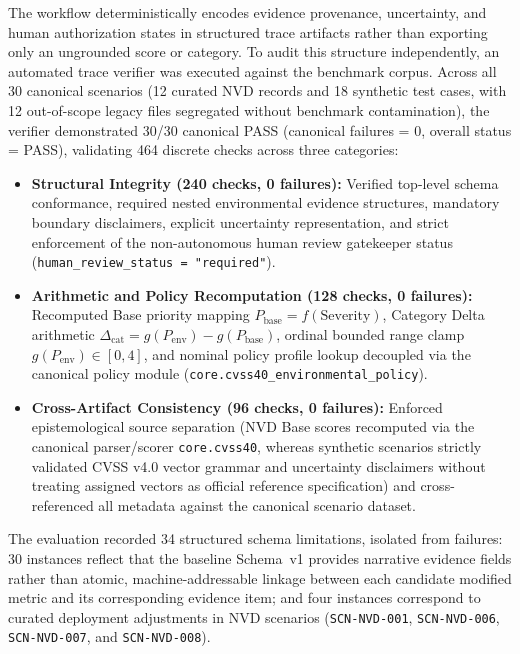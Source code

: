 \documentclass[conference]{IEEEtran}
\begin{document}
The workflow deterministically encodes evidence provenance, uncertainty, and human authorization states in structured trace artifacts rather than exporting only an ungrounded score or category. To audit this structure independently, an automated trace verifier was executed against the benchmark corpus. Across all 30 canonical scenarios (12 curated NVD records and 18 synthetic test cases, with 12 out-of-scope legacy files segregated without benchmark contamination), the verifier demonstrated 30/30 canonical PASS (canonical failures = 0, overall status = PASS), validating 464 discrete checks across three categories:
\begin{itemize}
    \item \textbf{Structural Integrity (240 checks, 0 failures):} Verified top-level schema conformance, required nested environmental evidence structures, mandatory boundary disclaimers, explicit uncertainty representation, and strict enforcement of the non-autonomous human review gatekeeper status (\texttt{human\_review\_status = "required"}).
    \item \textbf{Arithmetic and Policy Recomputation (128 checks, 0 failures):} Recomputed Base priority mapping $P_{\text{base}} = f(\text{Severity})$, Category Delta arithmetic $\Delta_{\text{cat}} = g(P_{\text{env}}) - g(P_{\text{base}})$, ordinal bounded range clamp $g(P_{\text{env}}) \in [0, 4]$, and nominal policy profile lookup decoupled via the canonical policy module (\texttt{core.cvss40\_environmental\_policy}).
    \item \textbf{Cross-Artifact Consistency (96 checks, 0 failures):} Enforced epistemological source separation (NVD Base scores recomputed via the canonical parser/scorer \texttt{core.cvss40}, whereas synthetic scenarios strictly validated CVSS v4.0 vector grammar and uncertainty disclaimers without treating assigned vectors as official reference specification) and cross-referenced all metadata against the canonical scenario dataset.
\end{itemize}

The evaluation recorded 34 structured schema limitations, isolated from failures: 30 instances reflect that the baseline Schema~v1 provides narrative evidence fields rather than atomic, machine-addressable linkage between each candidate modified metric and its corresponding evidence item; and four instances correspond to curated deployment adjustments in NVD scenarios (\texttt{SCN-NVD-001}, \texttt{SCN-NVD-006}, \texttt{SCN-NVD-007}, and \texttt{SCN-NVD-008}).
\end{document}
